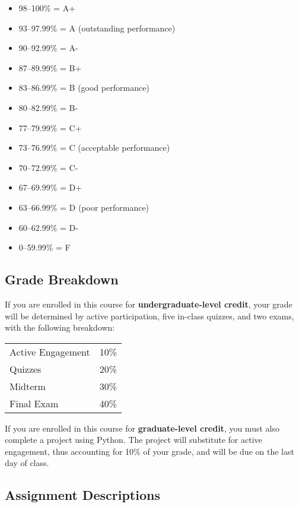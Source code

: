\documentclass{./../Latex/syllabus}
\begin{document}
\begin{itemize}
\item[] 98--100\% = A+ 
\item[] 93--97.99\% = A (outstanding performance) 
\item[] 90--92.99\% = A- 
\item[] 87--89.99\% = B+ 
\item[] 83--86.99\% = B (good performance) 
\item[] 80--82.99\% = B- 
\item[] 77--79.99\% = C+ 
\item[] 73--76.99\% = C (acceptable performance) 
\item[] 70--72.99\% = C- 
\item[] 67--69.99\% = D+ 
\item[] 63--66.99\% = D (poor performance) 
\item[] 60--62.99\% = D- 
\item[] 0--59.99\% = F 
\end{itemize}

\subsection*{Grade Breakdown}


\noindent If you are enrolled in this course for \textbf{undergraduate-level credit}, your grade will be determined by active participation, five in-class quizzes, and two exams, with the following breakdown:
\begin{center}
\begin{tabularx}{0.35\textwidth}{Xr}
Active Engagement & 10\% \\
Quizzes & 20\% \\
Midterm & 30\% \\
Final Exam & 40\% \\
\end{tabularx}
\end{center}
\noindent If you are enrolled in this course for \textbf{graduate-level credit}, you must also complete a project using Python. The project will substitute for active engagement, thus accounting for 10\% of your grade, and will be due on the last day of class. %

\subsection*{Assignment Descriptions}
\end{document}
